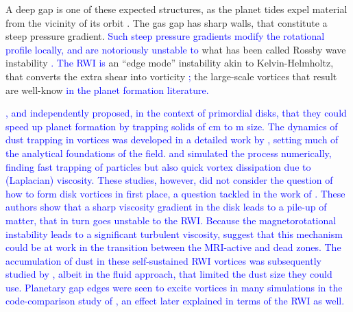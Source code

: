\documentclass[apj]{emulateapj}
\def\blue#1{\textcolor{blue}{ #1}}
\begin{document}
A deep gap is one of these expected structures, as the planet tides expel material from the vicinity of its orbit 
\citep{Papaloizou-Lin84,Lin-Papaloizou86a,Lin-Papaloizou86b,Nelson00,Masset-Snellgrove01,Paardekooper-Mellema04,Quillen04,deValBorro06,Klahr-Kley06,Lyra09a,Zhu11,Kley12,Kley-Nelson12}. 
The gas gap has sharp walls, that constitute a steep pressure gradient.
\blue{Such steep pressure gradients modify the rotational profile
  locally, and are notoriously unstable to} what has been called Rossby wave
instability \citep[RWI,][]{Lovelace-Hohlfeld78,Toomre81,Papaloizou-Pringle84,Papaloizou-Pringle85,Hawley87,Lovelace99}\blue{.}
\blue{The RWI is} an ``edge mode'' instability akin to Kelvin-Helmholtz, that converts the extra shear
into vorticity\blue{;} the large-scale vortices that result are well-know
\blue{in the planet formation literature.} 

\blue{\citet{Barge-Sommeria95,Adams-Watkins95}, and \citet{Tanga96}
independently proposed, in the context of primordial disks, that they could speed
up planet formation by trapping solids of cm to m
size. The dynamics of dust trapping in vortices was 
developed in a detailed work by \citet{Chavanis00}, setting much of
the analytical foundations of the
field. \citet{Godon-Livio99,Godon-Livio00} and \citet{Johansen04} simulated the process
numerically, finding fast trapping of particles but also quick vortex
dissipation due to (Laplacian) viscosity. These studies, however, did not consider the question of how to
form disk vortices in first place, a question tackled in 
the work of \cite{Varniere-Tagger06}. These authors show that a
sharp viscosity gradient in the disk leads to a pile-up of
matter, that in turn goes unstable to the RWI. Because the
magnetorotational instability \citep[MRI,][]{Balbus-Hawley91} leads to a significant turbulent
viscosity, \cite{Varniere-Tagger06} suggest that this mechanism could
be at work in the transition between the MRI-active and dead zones. The accumulation of dust
in these self-sustained RWI vortices was subsequently studied by
\citet{Inaba-Barge06}, albeit in the fluid approach, that limited the
dust size they could use. Planetary gap edges were seen to excite
vortices in many simulations in the code-comparison study of
\citet{deValBorro06}, an effect later explained \citep{deValBorro07} in
terms of the RWI as well.} 
\end{document}
